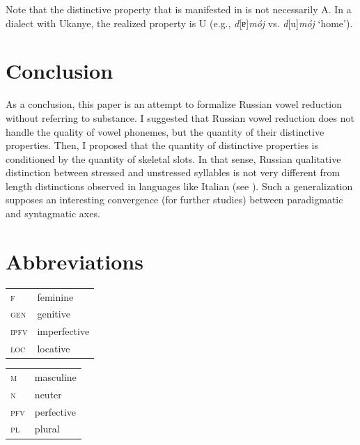\documentclass[output=paper,modfonts,newtxmath,hidelinks,]{langscibook}
\begin{document}
\noindent Note that the distinctive property that is manifested in  is not necessarily {\textbar}A{\textbar}. In a dialect with Ukanye, the realized property is {\textbar}U{\textbar} (e.g., \textit{d}[ɐ]\textit{mój} vs. \textit{d}[u]\textit{mój} ‘home’).

\section{Conclusion}\label{5:s5}

As a conclusion, this paper is an attempt to formalize Russian vowel reduction without referring to substance. I suggested that Russian vowel reduction does not handle the quality of vowel phonemes, but the quantity of their distinctive properties. Then, I proposed that the quantity of distinctive properties is conditioned by the quantity of skeletal slots. In that sense, Russian qualitative distinction between stressed and unstressed syllables is not very different from length distinctions observed in languages like Italian (see \citealt{Parmenter-Carman1932}). Such a generalization supposes an interesting convergence (for further studies) between paradigmatic and syntagmatic axes.


\section*{Abbreviations}

\begin{tabularx}{.5\textwidth}{@{}lQ@{}}
\textsc{f}&feminine\\
\textsc{gen}&genitive\\
\textsc{ipfv}&imperfective\\
\textsc{loc}&locative\\
\end{tabularx}%
\begin{tabularx}{.5\textwidth}{@{}lQ@{}}
\textsc{m}&masculine\\
\textsc{n}&neuter\\
\textsc{pfv}&perfective\\
\textsc{pl}&plural\\
\end{tabularx}

\sloppy
\printbibliography[heading=subbibliography,notkeyword=this]
\end{document}
